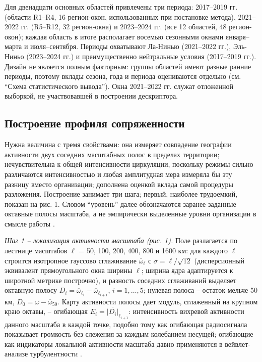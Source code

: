 \documentclass[12pt,a4paper]{article}
\begin{document}
Для двенадцати основных областей привлечены три периода: 2017--2019 гг. (области R1--R4, 16 регион-окон, использованных при постановке метода), 2021--2022 гг. (R5--R12, 32 регион-окна) и 2023--2024 гг. (все 12 областей, 48 регион-окон); каждая область в итоге располагает восемью сезонными окнами января--марта и июля--сентября. Периоды охватывают Ла-Нинью (2021--2022 гг.), Эль-Ниньо (2023--2024 гг.) и преимущественно нейтральные условия (2017--2019 гг.). Дизайн не является полным факторным: группы областей имеют разные ранние периоды, поэтому вклады сезона, года и периода оцениваются отдельно (см. “Схема статистического вывода”). Окна 2021--2022 гг. служат отложенной выборкой, не участвовавшей в построении дескриптора.

\subsection{Построение профиля сопряженности}

Нужна величина с тремя свойствами: она измеряет совпадение географии активности двух соседних масштабных полос в пределах территории; нечувствительна к общей интенсивности циркуляции, поскольку режимы сильно различаются интенсивностью и любая амплитудная мера измеряла бы эту разницу вместо организации; дополнена оценкой вклада самой процедуры разложения. Построение занимает три шага; первый, наиболее трудоемкий, показан на рис. 1. Словом “уровень” далее обозначаются заранее заданные октавные полосы масштаба, а не эмпирически выделенные уровни организации в смысле работы \cite{Krenke2019}.

\emph{Шаг 1 -- локализация активности масштаба (рис. 1).} Поле разлагается по лестнице масштабов $\ell$ = 50, 100, 200, 400, 800 и 1600 км: для каждого $\ell$ строится изотропное гауссово сглаживание $\overline{\omega}_\ell$ с $\sigma = \ell/\sqrt{12}$ (дисперсионный эквивалент прямоугольного окна ширины $\ell$; ширина ядра адаптируется к широтной метрике построчно), и разность соседних сглаживаний выделяет октавную полосу $D_i = \overline{\omega}_{\ell_i} - \overline{\omega}_{\ell_{i+1}}$, $i = 1, \dots, 5$; нулевая полоса -- остаток мельче 50 км, $D_0 = \omega - \overline{\omega}_{50}$. Карту активности полосы дает модуль, сглаженный на крупном краю октавы, -- огибающая $E_i = \overline{|D_i|}_{\ell_{i+1}}$: интенсивность вихревой активности данного масштаба в каждой точке, подобно тому как огибающая радиосигнала показывает громкость без слежения за каждым колебанием несущей; огибающие как индикаторы локальной активности масштаба давно применяются в вейвлет-анализе турбулентности \cite{Farge1992}.
\end{document}
